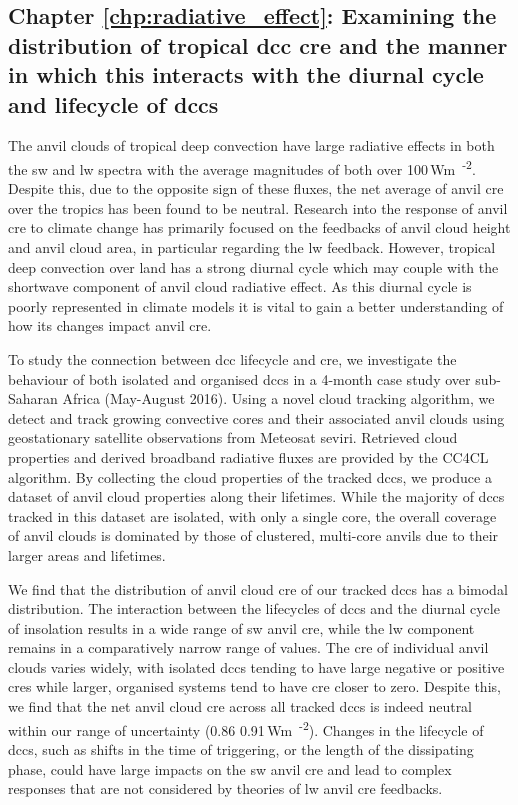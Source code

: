 \subsection{Chapter \ref{chp:radiative_effect}: Examining the distribution of tropical \acrshort{dcc} \acrshort{cre} and the manner in which this interacts with the diurnal cycle and lifecycle of \acrshort{dcc}s}

The anvil clouds of tropical deep convection have large radiative effects in both the \acrshort{sw} and \acrshort{lw} spectra with the average magnitudes of both over 100\,\unit{Wm\textsuperscript{-2}}. Despite this, due to the opposite sign of these fluxes, the net average of anvil \acrshort{cre} over the tropics has been found to be neutral. Research into the response of anvil \acrshort{cre} to climate change has primarily focused on the feedbacks of anvil cloud height and anvil cloud area, in particular regarding the \acrshort{lw} feedback. However, tropical deep convection over land has a strong diurnal cycle which may couple with the shortwave component of anvil cloud radiative effect. As this diurnal cycle is poorly represented in climate models it is vital to gain a better understanding of how its changes impact anvil \acrshort{cre}.

To study the connection between \acrshort{dcc} lifecycle and \acrshort{cre}, we investigate the behaviour of both isolated and organised \acrshort{dcc}s in a 4-month case study over sub-Saharan Africa (May-August 2016). Using a novel cloud tracking algorithm, we detect and track growing convective cores and their associated anvil clouds using geostationary satellite observations from Meteosat \acrshort{seviri}. Retrieved cloud properties and derived broadband radiative fluxes are provided by the CC4CL algorithm. By collecting the cloud properties of the tracked \acrshort{dcc}s, we produce a dataset of anvil cloud properties along their lifetimes. While the majority of \acrshort{dcc}s tracked in this dataset are isolated, with only a single core, the overall coverage of anvil clouds is dominated by those of clustered, multi-core anvils due to their larger areas and lifetimes.

We find that the distribution of anvil cloud \acrshort{cre} of our tracked \acrshort{dcc}s has a bimodal distribution. The interaction between the lifecycles of \acrshort{dcc}s and the diurnal cycle of insolation results in a wide range of \acrshort{sw} anvil \acrshort{cre}, while the \acrshort{lw} component remains in a comparatively narrow range of values. The \acrshort{cre} of individual anvil clouds varies widely, with isolated \acrshort{dcc}s tending to have large negative or positive \acrshort{cre}s while larger, organised systems tend to have \acrshort{cre} closer to zero.  Despite this, we find that the net anvil cloud \acrshort{cre} across all tracked \acrshort{dcc}s is indeed neutral within our range of uncertainty (0.86\,\textpm\,0.91\,\unit{Wm\textsuperscript{-2}}). Changes in the lifecycle of \acrshort{dcc}s, such as shifts in the time of triggering, or the length of the dissipating phase, could have large impacts on the \acrshort{sw} anvil \acrshort{cre} and lead to complex responses that are not considered by theories of \acrshort{lw} anvil \acrshort{cre} feedbacks.

